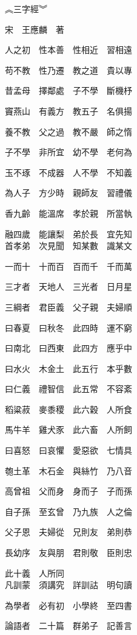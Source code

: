 \documentclass[a4paper,twocolumn]{article}
\begin{document}
\begin{Huge}
︽三字經︾
\\[0.8cm]
\end{Huge}
\begin{huge}
宋　王應麟　著
\\

\end{huge}
\begin{Large}
人之初　性本善　性相近　習相遠

苟不教　性乃遷　教之道　貴以專

昔孟母　擇鄰處　子不學　斷機杼

竇燕山　有義方　教五子　名俱揚

養不教　父之過　教不嚴　師之惰

子不學　非所宜　幼不學　老何為

玉不琢　不成器　人不學　不知義

為人子　方少時　親師友　習禮儀

香九齡　能溫席　孝於親　所當執

融四歲　能讓梨　弟於長　宜先知
\\

首孝弟　次見聞　知某數　識某文

一而十　十而百　百而千　千而萬

三才者　天地人　三光者　日月星

三綱者　君臣義　父子親　夫婦順

曰春夏　曰秋冬　此四時　運不窮

曰南北　曰西東　此四方　應乎中

曰水火　木金土　此五行　本乎數

曰仁義　禮智信　此五常　不容紊

稻粱菽　麥黍稷　此六穀　人所食

馬牛羊　雞犬豕　此六畜　人所飼

曰喜怒　曰哀懼　愛惡欲　七情具

匏土革　木石金　與絲竹　乃八音

高曾祖　父而身　身而子　子而孫

自子孫　至玄曾　乃九族　人之倫

父子恩　夫婦從　兄則友　弟則恭

長幼序　友與朋　君則敬　臣則忠

此十義　人所同
\\

凡訓蒙　須講究　詳訓詁　明句讀

為學者　必有初　小學終　至四書

論語者　二十篇　群弟子　記善言


\end{Large}
\end{document}
